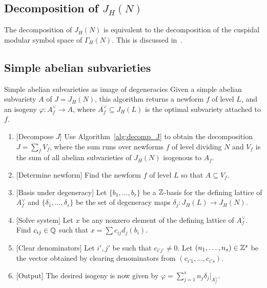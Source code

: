 \subsection{Decomposition of $J_H(N)$}%
\label{sub:decomposition_of_j_}

The decomposition of $J_H(N)$ is equivalent to the decomposition of the
cuspidal modular symbol space of $\Gamma_H(N)$. This is discussed in~\cite[\S
9]{stein:modform}.

\subsection{Simple abelian subvarieties}%
\label{sub:simple_abelian_subvarieties}

\begin{algorithm}{Simple abelian subvarieties as image of degeneracies}%
    \label{alg:simple_degen}
    Given a simple abelian subvariety $A$ of $J=J_H(N)$, this algorithm returns
    a newform $f$ of level $L$, and an isogeny $\varphi:A_f ^\vee\to A$, where
    $A_f ^\vee\subseteq J_H(L)$ is the optimal subvariety attached to $f$.
    \begin{enumerate}
        \item{} [Decompose $J$]
            Use Algorithm~\ref{alg:decomp_J} to obtain the decomposition
            $J=\sum_f V_f$, where the sum runs over newforms $f$ of level
            dividing $N$ and $V_f$ is the sum of all abelian subvarieties of
            $J_H(N)$ isogenous to $A_f$.
        \item{} [Determine newform]
            Find the newform $f$ of level $L$ so that $A\subseteq V_f$.
        \item{} [Basis under degeneracy]
            Let $\{b_1,\ldots,b_r\}$ be a $\mathbb{Z}$-basis for the defining lattice
            of $A_f^\vee$ and $\{\delta_1,\ldots,\delta_s\}$ be the set of degeneracy
            maps $\delta_j:J_H(L)\to J_H(N)$.
        \item{} [Solve system]
            Let $x$ be any nonzero element of the defining lattice of
            $A_f^\vee$. Find $c_{ij}\in \mathbb{Q}$ such that $x=\sum c_{ij}
            d_j(b_i)$.
        \item{} [Clear denominators]
            Let $i', j'$ be such that $c_{i'j'}\neq 0$. Let
            $(n_1,\ldots,n_s)\in \mathbb{Z}^s$ be the vector obtained by
            clearing denominators from $(c_{i'1},\ldots,c_{i's})$.
        \item{} [Output]
            The desired isogeny is now given by $\varphi=\sum_{j=1} ^s n_j
            \delta_j|_{A_f ^\vee}$.
    \end{enumerate}
\end{algorithm}

